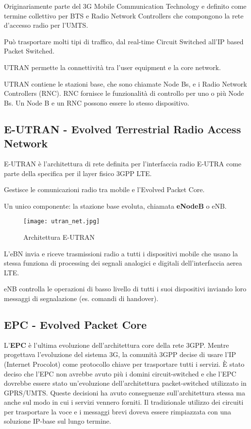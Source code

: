 Originariamente parte del 3G Mobile Communication Technology e definito come 
termine collettivo per BTS e Radio Network Controllers che compongono la rete 
d'accesso radio per l'UMTS.

Può trasportare molti tipi di traffico, dal real-time Circuit Switched all'IP 
based Packet Switched.

UTRAN permette la connettività tra l'user equipment e la core network.

UTRAN contiene le stazioni base, che sono chiamate Node Bs, e i Radio
Network Controllers (RNC).
RNC fornisce le funzionalità di controllo per uno o più Node Bs.
Un Node B e un RNC possono essere lo stesso dispositivo.

\subsection{E-UTRAN - Evolved Terrestrial Radio Access Network}

E-UTRAN è l'architettura di rete definita per l'interfaccia radio E-UTRA 
come parte della specifica per il layer fisico 3GPP LTE.

Gestisce le comunicazioni radio tra mobile e l'Evolved Packet Core.

Un unico componente: la stazione base evoluta, chiamata \textbf{eNodeB} o eNB.

\begin{figure}[H]
  \centering
  \texttt{[image: utran\_net.jpg]}
  \caption{Architettura E-UTRAN}
  \label{fig:utran_net}
\end{figure}

L'eBN invia e riceve trasmissioni radio a tutti i dispositivi mobile che usano la 
stessa funziona di processing dei segnali analogici e digitali dell'interfaccia aerea LTE.

eNB controlla le operazioni di basso livello di tutti i suoi dispositivi inviando loro
messaggi di segnalazione (es. comandi di handover).


\subsection{EPC - Evolved Packet Core}

L'\textbf{EPC} è l'ultima evoluzione dell'architettura core della rete 3GPP.
Mentre progettava l'evoluzione del sistema 3G, la comunità 3GPP decise di usare 
l'IP (Internet Procolot) come protocollo chiave per trasportare tutti i servizi.
È stato deciso che l'EPC non avrebbe avuto più i domini circuit-switched e che l'EPC 
dovrebbe essere stato un'evoluzione dell'architettura packet-switched utilizzato 
in GPRS/UMTS.
Queste decisioni ha avuto conseguenze sull'architettura stessa ma anche sul modo in
cui i servizi vennero forniti.
Il tradizionale utilizzo dei circuiti per trasportare la voce e i messaggi brevi 
doveva essere rimpiazzata con una soluzione IP-base sul lungo termine.

